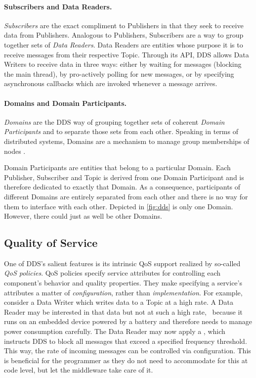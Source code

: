\paragraph{Subscribers and Data Readers.}
\emph{Subscribers} are the exact compliment to Publishers in that they seek to receive data from Publishers. Analogous to Publishers, Subscribers are a way to group together sets of \emph{Data Readers}. Data Readers are entities whose purpose it is to receive messages from their respective Topic. Through its API, DDS allows Data Writers to receive data in three ways: either by waiting for messages (blocking the main thread), by pro-actively polling for new messages, or by specifying asynchronous callbacks which are invoked whenever a message arrives.

\paragraph{Domains and Domain Participants.}
\emph{Domains} are the DDS way of grouping together sets of coherent \emph{Domain Participants} and to separate those sets from each other. Speaking in terms of distributed systems, Domains are a mechanism to manage group memberships of nodes \cite{tanenbaum2017distributed}. 

Domain Participants are entities that belong to a particular Domain. Each Publisher, Subscriber and Topic is derived from one Domain Participant and is therefore dedicated to exactly that Domain. As a consequence, participants of different Domains are entirely separated from each other and there is no way for them to interface with each other. Depicted in \autoref{fig:dds} is only one Domain. However, there could just as well be other Domains. 


\subsection{Quality of Service}

One of DDS's salient features is its intrinsic QoS support realized by so-called \emph{QoS policies}. QoS policies specify service attributes for controlling each component's behavior and quality properties. They make specifying a service's attributes a matter of \emph{configuration}, rather than \emph{implementation}. For example, consider  a Data Writer which writes data to a Topic at a high rate. A Data Reader may be interested in that data but not at such a high rate, \eg\ because it runs on an embedded device powered by a battery and therefore needs to manage power consumption carefully. The Data Reader may now apply a \tbf , which instructs DDS to block all messages that exceed a specified frequency threshold. This way, the rate of incoming messages can be controlled via configuration. This is beneficial for the programmer as they do not need to accommodate for this at code level, but let the middleware take care of it.

